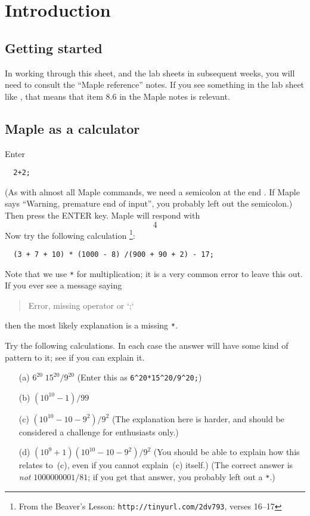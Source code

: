 \documentclass[a4paper,10pt]{amsbook}
\numberwithin{example}{chapter}
\begin{document}
\chapter{Introduction}

\section{Getting started}

In working through this sheet, and the lab sheets in subsequent weeks,
you will need to consult the ``Maple reference'' notes.  If you see
something in the lab sheet like , that means that item 8.6
in the Maple notes is relevant.

\section{Maple as a calculator}

\begin{exercise}\label{ex-twoplustwo}
 Enter
\begin{verbatim}
  2+2;
\end{verbatim}
 (As with almost all Maple commands, we need a semicolon at
 the end \note{\NOTEsemi}.  If Maple says ``Warning,
 premature end of input'', you probably left out the
 semicolon.)  Then press the ENTER key.  Maple will respond
 with
 \[ 4 \]
 Now try the following calculation%
 \footnote{From the Beaver's Lesson:
 \verb~http://tinyurl.com/2dv793~,
 verses 16--17}:
\begin{verbatim}
  (3 + 7 + 10) * (1000 - 8) /(900 + 90 + 2) - 17;
\end{verbatim}
 Note that we use \verb~*~ for
 multiplication\note{\NOTEstar}; it is a very common error to 
 leave this out.  If you ever see a message saying
 \begin{quotation}
  Error, missing operator or `;` 
 \end{quotation}
 then the most likely explanation is a missing \verb~*~.  
\end{exercise}

\begin{exercise}\label{ex-numeric-misc}
 Try the following calculations.  In each case the answer will have
 some kind of pattern to it; see if you can explain it. 
 \begin{itemize}
  \item[(a)] $6^{20}\;15^{20}/9^{20}$ (Enter this as
   \verb~6^20*15^20/9^20;~) 
  \item[(b)] $(10^{10}-1)/99$
  \item[(c)] $(10^{10}-10-9^2)/9^2$ (The explanation here is
   harder, and should be considered a challenge for enthusiasts only.)  
  \item[(d)] $(10^9+1)(10^{10}-10-9^2)/9^2$ (You should be able to
   explain how this relates to~(c), even if you cannot explain~(c)
   itself.)  (The correct answer is \emph{not}
   $1000000001/81$; if you get that answer, you probably
   left out a \verb~*~.) 
 \end{itemize}
\end{exercise}
\end{document}
